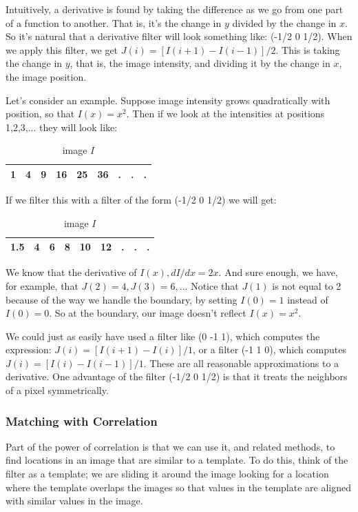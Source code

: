 \documentclass{report}
\begin{document}
Intuitively, a derivative is found by taking the difference as we go from one part of a function to another. That is, it's the change in $y$ divided by the change in $x$. So it's natural that a derivative filter will look something like: (-1/2 0 1/2). When we apply this filter, we get $J(i) = [I(i+1)-I(i-1)]/2$. This is taking the change in $y$, that is, the image intensity, and dividing it by the change in $x$, the image position.\newline

Let's consider an example. Suppose image intensity grows quadratically with position, so that $I(x)=x^2$. Then if we look at the intensities at positions 1,2,3,... they will look like:\newline
\begin{table}[h]
\centering
\label{my-label-3}
\begin{tabular}{|l|l|l|l|l|l|l|l|l|}
\hline
1 & 4 & 9 & 16 & 25 & 36 & . & . & . \\ \hline
\end{tabular}
\caption{image $I$}
\end{table}

If we filter this with a filter of the form (-1/2 0 1/2) we will get:\newline
\begin{table}[h]
\centering
\label{my-label-4}
\begin{tabular}{|l|l|l|l|l|l|l|l|l|}
\hline
1.5 & 4 & 6 & 8 & 10 & 12 & . & . & . \\ \hline
\end{tabular}
\caption{image $I$}
\end{table}

We know that the derivative of $I(x), dI/dx = 2x$. And sure enough, we have, for example, that $J(2)=4, J(3)=6, ...$ Notice that $J(1)$ is not equal to 2 because of the way we handle the boundary, by setting $I(0) = 1$ instead of $I(0) = 0$. So at the boundary, our image doesn't reflect $I(x) = x^2$.\newline

We could just as easily have used a filter like (0 -1 1), which computes the expression: $J(i) = [I(i+1)-I(i)]/1$, or a filter (-1 1 0), which computes $J(i) = [I(i)-I(i-1)]/1$. These are all reasonable approximations to a derivative. One advantage of the filter (-1/2 0 1/2) is that it treats the neighbors of a pixel symmetrically.

\subsubsection{Matching with Correlation}
Part of the power of correlation is that we can use it, and related methods, to find locations in an image that are similar to a template. To do this, think of the filter as a template; we are sliding it around the image looking for a location where the template overlaps the images so that values in the template are aligned with similar values in the image.\newline
\end{document}
